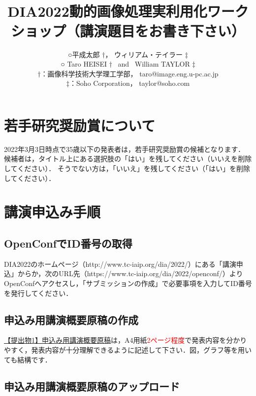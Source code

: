 \documentclass[a4j,twocolumn,10pt]{jarticle}
\title{
\vspace{15mm}
\Large{
\textbf{\leftline{【若手研究奨励賞候補：はい/いいえ】（該当する方を残して下さい）}}\\
\textbf{DIA2022動的画像処理実利用化ワークショップ（講演題目をお書き下さい）}} %
}
\author{
\vspace{1.5em}
\large{○平成太郎 $\dagger$，} %
\large{ウィリアム・テイラー $\ddagger$}\\                 %
\vspace{1em}
\large{{\rm ○ Taro HEISEI $\dagger$\ }             %
{\rm and\ }
{\rm William TAYLOR $\ddagger$} }\\     %
\vspace{0.5em}
\large{$\dagger$：画像科学技術大学理工学部，}     %
{\rm taro@image.eng.u-pc.ac.jp} \\                    %
\large{$\ddagger$：Soho Corporation，}    %
{\rm taylor@soho.com }\\                     %
}
\date{} %
\begin{document}
\vspace{1em}

\section{若手研究奨励賞について}
2022年3月3日時点で35歳以下の発表者は，若手研究奨励賞の候補となります．
候補者は，タイトル上にある選択肢の「はい」を残してください（いいえを削除してください）．
そうでない方は，「いいえ」を残してください（「はい」を削除してください）．

\section{講演申込み手順}

\subsection{OpenConfでID番号の取得}

DIA2022のホームページ（http://www.tc-iaip.org/dia/2022/）にある「講演申込」からか，次のURL先（https://www.tc-iaip.org/dia/2022/openconf/）よりOpenConfへアクセスし，「サブミッションの作成」で必要事項を入力してID番号を発行してください．

\subsection{申込み用講演概要原稿の作成}

\underline{【提出物1】申込み用講演概要原稿}は，A4用紙\textcolor{red}{2ページ程度}で発表内容を分かりやすく，発表内容が十分理解できるように記述して下さい．図，グラフ等を用いても結構です．

\subsection{申込み用講演概要原稿のアップロード}
\end{document}
